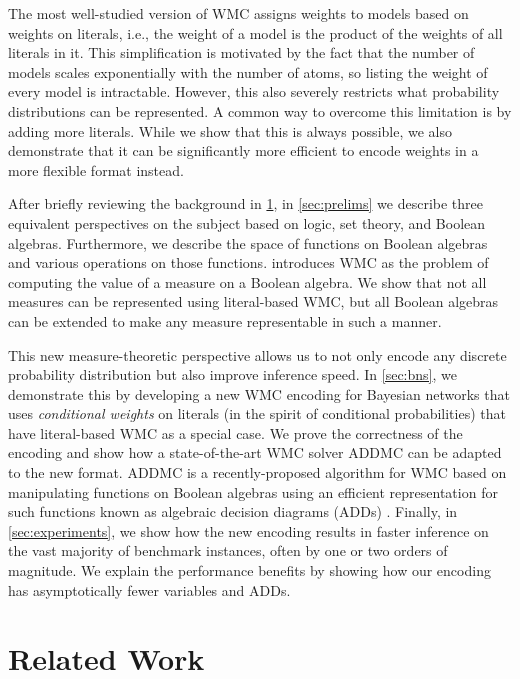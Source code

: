 \documentclass{uai2021} %
\theoremstyle{definition}
\begin{document}
The most well-studied version of WMC assigns weights to models based on
weights on literals, i.e., the weight of a model is the product of the weights
of all literals in it. This simplification is motivated by the fact that the
number of models scales exponentially with the number of atoms, so listing the
weight of every model is intractable. However, this also severely restricts what
probability distributions can be represented. A common way to overcome this
limitation is by adding more literals. While we show that this is always
possible, we also demonstrate that it can be significantly more efficient to
encode weights in a more flexible format instead.

After briefly reviewing the background in \cref{sec:related}, in
\cref{sec:prelims} we  describe three equivalent perspectives on the subject
based on logic, set theory, and Boolean algebras. Furthermore, we describe the
space of functions on Boolean algebras and various operations on those
functions.  introduces WMC as the problem of computing
the value of a measure on a Boolean algebra. We show that not all measures can
be represented using literal-based WMC, but all Boolean algebras can be extended
to make any measure representable in such a manner.

This new measure-theoretic perspective allows us to not only encode any
discrete probability distribution but also improve inference speed. In
\cref{sec:bns}, we demonstrate this by developing a new WMC encoding for
Bayesian networks that uses \emph{conditional weights} on literals (in the
spirit of conditional probabilities) that have literal-based WMC as a special
case. We prove the correctness of the encoding and show how a state-of-the-art
WMC solver \textsf{ADDMC} \citep{DBLP:conf/aaai/DudekPV20} can be adapted to the
new format. \textsf{ADDMC} is a recently-proposed algorithm for WMC based on
manipulating functions on Boolean algebras using an efficient representation for
such functions known as algebraic decision diagrams (ADDs)
\citep{DBLP:journals/fmsd/BaharFGHMPS97}. Finally, in \cref{sec:experiments}, we
show how the new encoding results in faster inference on the vast majority of
benchmark instances, often by one or two orders of magnitude. We explain the
performance benefits by showing how our encoding has asymptotically fewer
variables and ADDs.

\section{Related Work} \label{sec:related}
\end{document}
